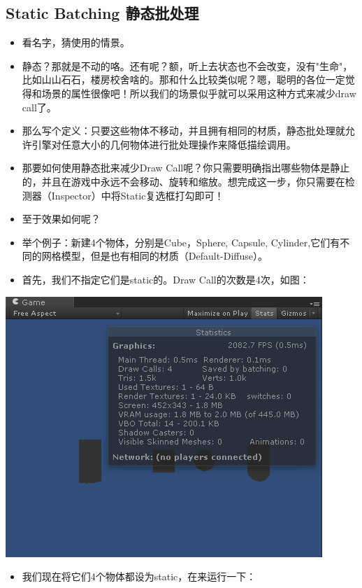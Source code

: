 \documentclass[9pt, b5paper]{article}
\begin{document}
\subsection{Static Batching 静态批处理}
\label{sec:org2f0c3f2}
\begin{itemize}
\item 看名字，猜使用的情景。
\item 静态？那就是不动的咯。还有呢？额，听上去状态也不会改变，没有"生命"，比如山山石石，楼房校舍啥的。那和什么比较类似呢？嗯，聪明的各位一定觉得和场景的属性很像吧！所以我们的场景似乎就可以采用这种方式来减少draw call了。
\item 那么写个定义：只要这些物体不移动，并且拥有相同的材质，静态批处理就允许引擎对任意大小的几何物体进行批处理操作来降低描绘调用。
\item 那要如何使用静态批来减少Draw Call呢？你只需要明确指出哪些物体是静止的，并且在游戏中永远不会移动、旋转和缩放。想完成这一步，你只需要在检测器（Inspector）中将Static复选框打勾即可！
\item 至于效果如何呢？
\item 举个例子：新建4个物体，分别是Cube，Sphere, Capsule, Cylinder,它们有不同的网格模型，但是也有相同的材质（Default-Diffuse）。
\item 首先，我们不指定它们是static的。Draw Call的次数是4次，如图：
\end{itemize}

\begin{center}
\includegraphics[width=.9\linewidth]{./pic/batching1.png}
\end{center}
\begin{itemize}
\item 我们现在将它们4个物体都设为static，在来运行一下：
\end{itemize}
\end{document}
